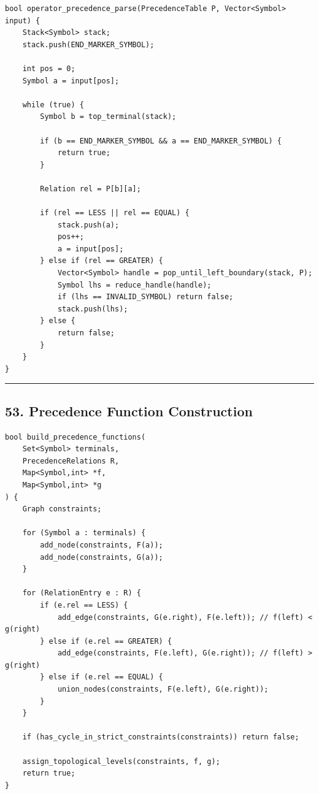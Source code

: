 \documentclass[10pt,letterpaper]{article}
\begin{document}
\begin{verbatim}
bool operator_precedence_parse(PrecedenceTable P, Vector<Symbol> input) {
    Stack<Symbol> stack;
    stack.push(END_MARKER_SYMBOL);

    int pos = 0;
    Symbol a = input[pos];

    while (true) {
        Symbol b = top_terminal(stack);

        if (b == END_MARKER_SYMBOL && a == END_MARKER_SYMBOL) {
            return true;
        }

        Relation rel = P[b][a];

        if (rel == LESS || rel == EQUAL) {
            stack.push(a);
            pos++;
            a = input[pos];
        } else if (rel == GREATER) {
            Vector<Symbol> handle = pop_until_left_boundary(stack, P);
            Symbol lhs = reduce_handle(handle);
            if (lhs == INVALID_SYMBOL) return false;
            stack.push(lhs);
        } else {
            return false;
        }
    }
}
\end{verbatim}

\medskip\hrule\medskip

\subsection*{53. Precedence Function Construction}

\begin{verbatim}
bool build_precedence_functions(
    Set<Symbol> terminals,
    PrecedenceRelations R,
    Map<Symbol,int> *f,
    Map<Symbol,int> *g
) {
    Graph constraints;

    for (Symbol a : terminals) {
        add_node(constraints, F(a));
        add_node(constraints, G(a));
    }

    for (RelationEntry e : R) {
        if (e.rel == LESS) {
            add_edge(constraints, G(e.right), F(e.left)); // f(left) < g(right)
        } else if (e.rel == GREATER) {
            add_edge(constraints, F(e.left), G(e.right)); // f(left) > g(right)
        } else if (e.rel == EQUAL) {
            union_nodes(constraints, F(e.left), G(e.right));
        }
    }

    if (has_cycle_in_strict_constraints(constraints)) return false;

    assign_topological_levels(constraints, f, g);
    return true;
}
\end{verbatim}
\end{document}
